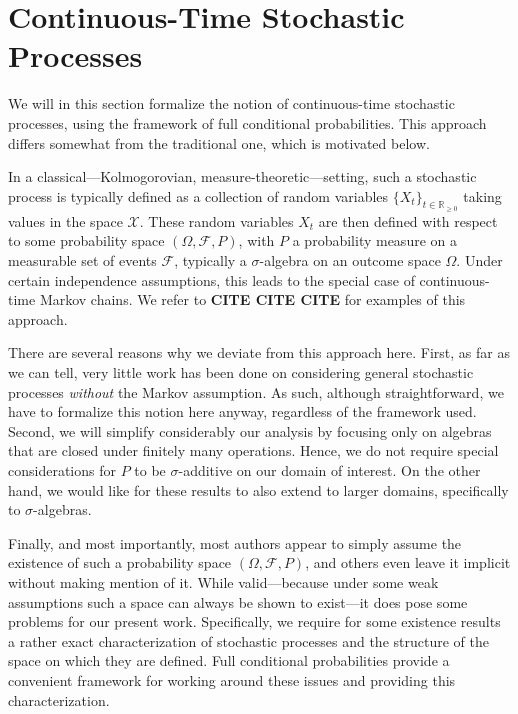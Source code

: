 \documentclass[10pt,a4paper]{paper}
\theoremstyle{definition}
\newcommand{\reals}{\mathbb{R}}
\newcommand{\realsnonneg}{\reals_{\geq 0}}
\newcommand{\states}{\mathcal{X}}
\begin{document}

\section{Continuous-Time Stochastic Processes}\label{sec:stochastic_processes}

We will in this section formalize the notion of continuous-time stochastic processes, using the framework of full conditional probabilities. This approach differs somewhat from the traditional one, which is motivated below.

In a classical---Kolmogorovian, measure-theoretic---setting, such a stochastic process is typically defined as a collection of random variables $\{X_t\}_{t\in\realsnonneg}$ taking values in the space $\states$. These random variables $X_t$ are then defined with respect to some probability space $(\Omega,\mathcal{F},P)$, with $P$ a probability measure on a measurable set of events $\mathcal{F}$, typically a $\sigma$-algebra on an outcome space $\Omega$. Under certain independence assumptions, this leads to the special case of continuous-time Markov chains. We refer to {\bf CITE CITE CITE} for examples of this approach.

There are several reasons why we deviate from this approach here. First, as far as we can tell, very little work has been done on considering general stochastic processes \emph{without} the Markov assumption. As such, although straightforward, we have to formalize this notion here anyway, regardless of the framework used. Second, we will simplify considerably our analysis by focusing only on algebras that are closed under finitely many operations. Hence, we do not require special considerations for $P$ to be $\sigma$-additive on our domain of interest. On the other hand, we would like for these results to also extend to larger domains, specifically to $\sigma$-algebras. 

Finally, and most importantly, most authors appear to simply assume the existence of such a probability space $(\Omega,\mathcal{F},P)$, and others even leave it implicit without making mention of it. While valid---because under some weak assumptions such a space can always be shown to exist---it does pose some problems for our present work. Specifically, we require for some existence results a rather exact characterization of stochastic processes and the structure of the space on which they are defined. Full conditional probabilities provide a convenient framework for working around these issues and providing this characterization.
\end{document}
